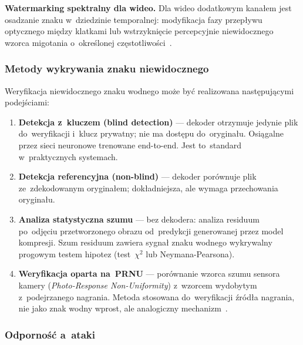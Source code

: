 \textbf{Watermarking spektralny dla wideo.}
Dla wideo dodatkowym kana\l{}em jest osadzanie znaku
w~dziedzinie temporalnej: modyfikacja fazy przep\l{}ywu
optycznego mi\k{e}dzy klatkami lub wstrzykni\k{e}cie
percepcyjnie niewidocznego wzorca migotania
o~okre\'{s}lonej cz\k{e}stotliwo\'{s}ci~\cite{Luo2025WatermarkingAIGC}.

\subsubsection{Metody wykrywania znaku niewidocznego}
\label{sec:watermark_detect}

Weryfikacja niewidocznego znaku wodnego mo\.{z}e by\'{c}
realizowana nast\k{e}puj\k{a}cymi podej\'{s}ciami:

\begin{enumerate}
  \item \textbf{Detekcja z~kluczem (blind detection)} ---
        dekoder otrzymuje jedynie plik do~weryfikacji
        i~klucz prywatny; nie ma dost\k{e}pu do~orygina\l{}u.
        Osi\k{a}galne przez sieci neuronowe trenowane end-to-end.
        Jest to~standard w~praktycznych systemach.

  \item \textbf{Detekcja referencyjna (non-blind)} ---
        dekoder por\'{o}wnuje plik ze~zdekodowanym orygina\l{}em;
        dok\l{}adniejsza, ale wymaga przechowania orygina\l{}u.

  \item \textbf{Analiza statystyczna szumu} ---
        bez dekodera: analiza residuum po~odj\k{e}ciu przetworzonego
        obrazu od~predykcji generowanej przez model kompresji.
        Szum residuum zawiera sygna\l{} znaku wodnego wykrywalny
        progowym testem hipotez (test~$\chi^2$ lub Neymana-Pearsona).

  \item \textbf{Weryfikacja oparta na~PRNU} ---
        por\'{o}wnanie wzorca szumu sensora kamery
        (\textit{Photo-Response Non-Uniformity}) z~wzorcem
        wydobytym z~podejrzanego nagrania.
        Metoda stosowana do~weryfikacji \'{z}r\'{o}d\l{}a nagrania,
        nie jako znak wodny wprost, ale analogiczny
        mechanizm~\cite{Wang2024ReliabilityPerspective}.
\end{enumerate}

\subsubsection{Odporno\'{s}\'{c} a~ataki}
\label{sec:watermark_attacks}

